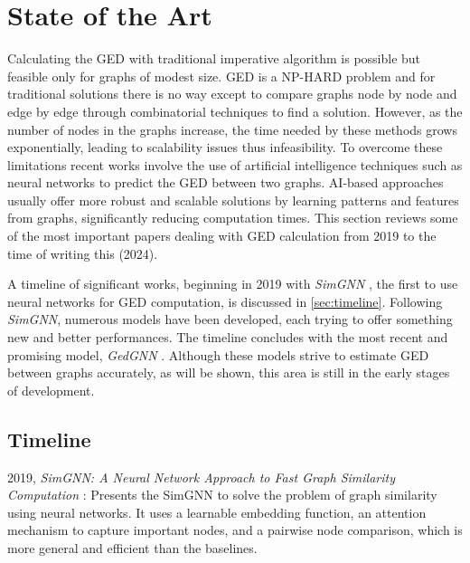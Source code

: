 \documentclass[../Thesis.tex]{subfiles}
\begin{document}
	
	\chapter{State of the Art}
	\label{sec:state_of_the_art_review}
	
	Calculating the GED with traditional imperative algorithm is possible but feasible only for graphs of modest size. GED is a NP-HARD problem and for traditional solutions there is no way except to compare graphs node by node and edge by edge through combinatorial techniques to find a solution. However, as the number of nodes in the graphs increase, the time needed by these methods grows exponentially, leading to scalability issues thus infeasibility. To overcome these limitations recent works involve the use of artificial intelligence techniques such as neural networks to predict the GED between two graphs. AI-based approaches usually offer more robust and scalable solutions by learning patterns and features from graphs, significantly reducing computation times. This section reviews some of the most important papers dealing with GED calculation from 2019 to the time of writing this (2024).

	A timeline of significant works, beginning in 2019 with \textit{SimGNN} \cite{simgnn__a_neural_network_approach_to_fast_graph_similarity_computation}, the first to use neural networks for GED computation, is discussed in \autoref{sec:timeline}. Following \textit{SimGNN}, numerous models have been developed, each trying to offer something new and better performances. The timeline concludes with the most recent and promising model, \textit{GedGNN} \cite{computing_graph_edit_distance_via_neural_graph_matching}. Although these models strive to estimate GED between graphs accurately, as will be shown, this area is still in the early stages of development.
	
	
	\section{Timeline}
	\label{sec:timeline}
        \quad
 
	2019, \textit{SimGNN: A Neural Network Approach to Fast Graph Similarity Computation} \cite{simgnn__a_neural_network_approach_to_fast_graph_similarity_computation}: Presents the SimGNN to solve the problem of graph similarity using neural networks. It uses a learnable embedding function, an attention mechanism to capture important nodes, and a pairwise node comparison, which is more general and efficient than the baselines.
	
\end{document}
